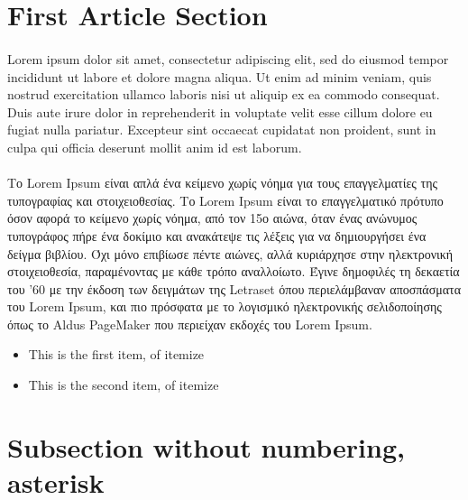 \documentclass[a4paper]{article}
\begin{document}
\tableofcontents

\listoffigures

\listoflistings

\listoftables

\newpage

\section{First Article Section}
\paragraph{}Lorem ipsum dolor sit amet, consectetur adipiscing elit, sed do eiusmod tempor incididunt ut labore et dolore magna aliqua.
Ut enim ad minim veniam, quis nostrud exercitation ullamco laboris nisi ut aliquip ex ea commodo consequat. Duis aute irure dolor in
reprehenderit in voluptate velit esse cillum dolore eu fugiat nulla pariatur. Excepteur sint occaecat cupidatat non proident, sunt in
culpa qui officia deserunt mollit anim id est laborum.
\paragraph{}Το Lorem Ipsum είναι απλά ένα κείμενο χωρίς νόημα για τους επαγγελματίες της τυπογραφίας και στοιχειοθεσίας.
Το Lorem Ipsum είναι το επαγγελματικό πρότυπο όσον αφορά το κείμενο χωρίς νόημα, από τον 15ο αιώνα, όταν ένας ανώνυμος
τυπογράφος πήρε ένα δοκίμιο και ανακάτεψε τις λέξεις για να δημιουργήσει ένα δείγμα βιβλίου. Όχι μόνο επιβίωσε πέντε αιώνες,
αλλά κυριάρχησε στην ηλεκτρονική στοιχειοθεσία, παραμένοντας με κάθε τρόπο αναλλοίωτο. Έγινε δημοφιλές τη δεκαετία του '60 με την
έκδοση των δειγμάτων της Letraset όπου περιελάμβαναν αποσπάσματα του Lorem Ipsum, και πιο πρόσφατα με το λογισμικό ηλεκτρονικής
σελιδοποίησης όπως το Aldus PageMaker που περιείχαν εκδοχές του Lorem Ipsum.

\begin{itemize}
\item This is the first item, of itemize
\item This is the second item, of itemize
\end{itemize}

\section*{Subsection without numbering, asterisk}
\end{document}
